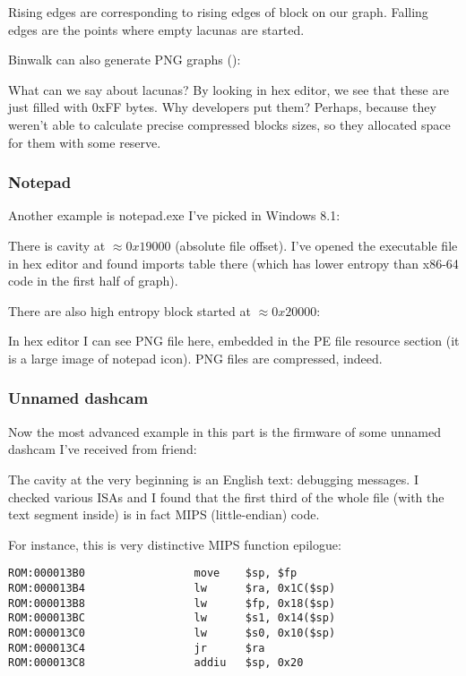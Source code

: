 Rising edges are corresponding to rising edges of block on our graph.
Falling edges are the points where empty lacunas are started.

Binwalk can also generate PNG graphs ():



What can we say about lacunas? By looking in hex editor, we see that these are just filled with 0xFF bytes.
Why developers put them?
Perhaps, because they weren't able to calculate precise compressed blocks sizes, so they allocated space
for them with some reserve.

\subsubsection{Notepad}


Another example is notepad.exe I've picked in Windows 8.1:



There is cavity at $\approx 0x19000$ (absolute file offset).
I've opened the executable file in hex editor and found imports table there (which has lower entropy than x86-64 code
in the first half of graph).

There are also high entropy block started at $\approx 0x20000$:



In hex editor I can see PNG file here, embedded in the PE file resource section (it is a large image of notepad icon).
PNG files are compressed, indeed.

\subsubsection{Unnamed dashcam}

Now the most advanced example in this part is the firmware of some unnamed dashcam I've received from friend:



The cavity at the very beginning is an English text: debugging messages.
I checked various \ac{ISA}s and I found that 
the first third of the whole file (with the text segment inside) is in fact MIPS (little-endian) code.

For instance, this is very distinctive MIPS function epilogue:

\begin{lstlisting}[style=customasmMIPS]
ROM:000013B0                 move    $sp, $fp
ROM:000013B4                 lw      $ra, 0x1C($sp)
ROM:000013B8                 lw      $fp, 0x18($sp)
ROM:000013BC                 lw      $s1, 0x14($sp)
ROM:000013C0                 lw      $s0, 0x10($sp)
ROM:000013C4                 jr      $ra
ROM:000013C8                 addiu   $sp, 0x20
\end{lstlisting}

